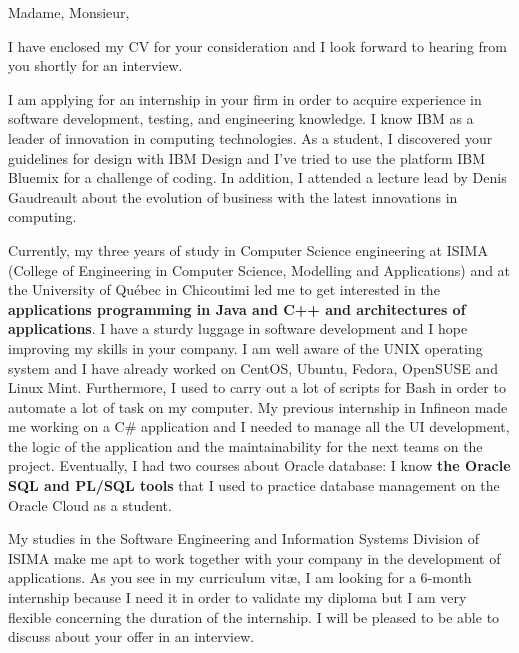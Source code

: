 \date{\today}
\opening{Madame, Monsieur,}
\closing{I have enclosed my CV for your consideration and I look forward to hearing from you shortly for an interview.}

\makelettertitle

I am applying for an internship in your firm in order to acquire experience in software development, testing, and engineering knowledge. I know IBM as a leader of innovation in computing technologies. As a student, I discovered your guidelines for design with IBM Design and I've tried to use the platform IBM Bluemix for a challenge of coding. In addition, I attended a lecture lead by Denis Gaudreault about the evolution of business with the latest innovations in computing.

Currently, my three years of study in Computer Science engineering at ISIMA (College of Engineering in Computer Science, Modelling and Applications) and at the University of Québec in Chicoutimi led me to get interested in the \textbf{applications programming in Java and C++ and architectures of applications}. I have a sturdy luggage in software development and I hope improving my skills in your company. I am well aware of the UNIX operating system and I have already worked on CentOS, Ubuntu, Fedora, OpenSUSE and Linux Mint. Furthermore, I used to carry out a lot of scripts for Bash in order to automate a lot of task on my computer. My previous internship in Infineon made me working on a C\# application and I needed to manage all the UI development, the logic of the application and the maintainability for the next teams on the project. Eventually, I had two courses about Oracle database: I know \textbf{the Oracle SQL and PL/SQL tools} that I used to practice database management on the Oracle Cloud as a student.

My studies in the Software Engineering and Information Systems Division of ISIMA make me apt to work together with your company in the development of applications. As you see in my curriculum vit\ae{}, I am looking for a 6-month internship because I need it in order to validate my diploma but I am very flexible concerning the duration of the internship. I will be pleased to be able to discuss about your offer in an interview.

\makeletterclosing

